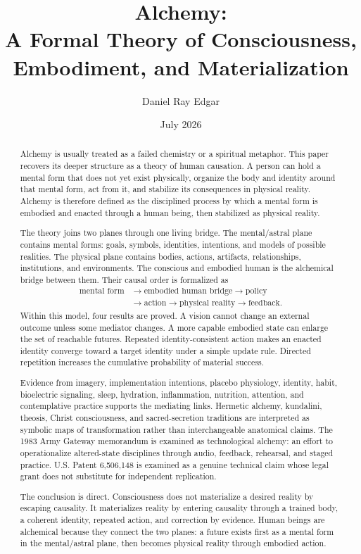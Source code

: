 \documentclass[11pt]{article}
\title{%
  \vspace{-0.6cm}
  \textbf{Alchemy:}\\[4pt]
  \textbf{A Formal Theory of Consciousness,}\\[-1pt]
  \textbf{Embodiment, and Materialization}
  \vspace{0.25cm}
}
\author{Daniel Ray Edgar}
\date{\normalsize July 2026}
\theoremstyle{plain}
\theoremstyle{definition}
\begin{document}
\maketitle
\thispagestyle{empty}

\begin{abstract}
Alchemy is usually treated as a failed chemistry or a spiritual metaphor. This paper
recovers its deeper structure as a theory of human causation. A person can hold a
mental form that does not yet exist physically, organize the body and identity around
that mental form, act from it, and stabilize its consequences in physical reality.
Alchemy is therefore defined as the disciplined process by which a mental form is
embodied and enacted through a human being, then stabilized as physical reality.

The theory joins two planes through one living bridge. The mental/astral plane contains
mental forms: goals, symbols, identities, intentions, and models of possible realities.
The physical plane contains bodies, actions, artifacts, relationships, institutions,
and environments. The conscious and embodied human is the alchemical bridge between
them. Their causal order is formalized as
\[
\begin{aligned}
\text{mental form}
&\rightarrow\text{embodied human bridge}\rightarrow\text{policy}\\
&\rightarrow\text{action}\rightarrow\text{physical reality}\rightarrow\text{feedback}.
\end{aligned}
\]
Within this model, four results are proved. A vision cannot change an external outcome
unless some mediator changes. A more capable embodied state can enlarge the set of
reachable futures. Repeated identity-consistent action makes an enacted identity
converge toward a target identity under a simple update rule. Directed repetition
increases the cumulative probability of material success.

Evidence from imagery, implementation intentions, placebo physiology, identity,
habit, bioelectric signaling, sleep, hydration, inflammation, nutrition, attention,
and contemplative practice supports the mediating links. Hermetic alchemy, kundalini,
theosis, Christ consciousness, and sacred-secretion traditions are interpreted as
symbolic maps of transformation rather than interchangeable anatomical claims. The
1983 Army Gateway memorandum is examined as technological alchemy: an effort to
operationalize altered-state disciplines through audio, feedback, rehearsal, and
staged practice. U.S. Patent 6,506,148 is examined as a genuine technical claim whose
legal grant does not substitute for independent replication.

The conclusion is direct. Consciousness does not materialize a desired reality by
escaping causality. It materializes reality by entering causality through a trained
body, a coherent identity, repeated action, and correction by evidence. Human beings
are alchemical because they connect the two planes: a future exists first as a mental
form in the mental/astral plane, then becomes physical reality through embodied action.
\end{abstract}
\end{document}
